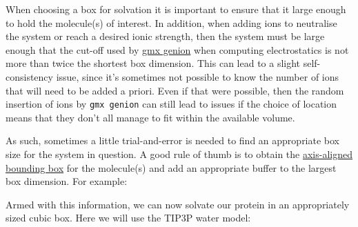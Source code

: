 When choosing a box for solvation it is important to ensure that it
large enough to hold the molecule(s) of interest. In addition, when
adding ions to neutralise the system or reach a desired ionic strength,
then the system must be large enough that the cut-off used by
\href{https://manual.gromacs.org/archive/5.0/programs/gmx-genion.html}{gmx
genion} when computing electrostatics is not more than twice the
shortest box dimension. This can lead to a slight self-consistency
issue, since it's sometimes not possible to know the number of ions that
will need to be added a priori. Even if that were possible, then the
random insertion of ions by \texttt{gmx\ genion} can still lead to
issues if the choice of location means that they don't all manage to fit
within the available volume.

As such, sometimes a little trial-and-error is needed to find an
appropriate box size for the system in question. A good rule of thumb is
to obtain the
\href{https://en.wikipedia.org/wiki/Bounding_volume}{axis-aligned
bounding box} for the molecule(s) and add an appropriate buffer to the
largest box dimension. For example:

\begin{Shaded}
\begin{Highlighting}[]
\OperatorTok{=}

\OperatorTok{=}\NormalTok{ [y }\OperatorTok{-} \NormalTok{(box_min, box_max)]}

\OperatorTok{=}  \OperatorTok{*}

\OperatorTok{=} \OperatorTok{+} \OperatorTok{*}
\end{Highlighting}
\end{Shaded}

Armed with this information, we can now solvate our protein in an
appropriately sized cubic box. Here we will use the TIP3P water model:

